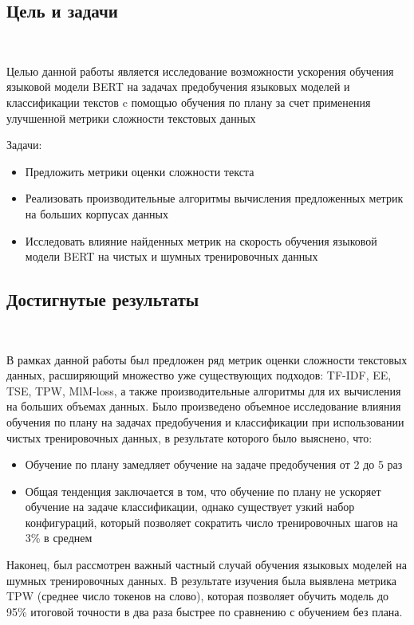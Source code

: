 \documentclass{spbau-diploma}
\begin{document}
\subsection*{Цель и задачи}
\ 

Целью данной работы является исследование возможности ускорения обучения языковой модели BERT на задачах предобучения языковых моделей и классификации текстов c помощью обучения по плану за счет применения улучшенной метрики сложности текстовых данных

\vspace*{20pt}
Задачи:
\begin{itemize}
	\item Предложить метрики оценки сложности текста
	\item Реализовать производительные алгоритмы вычисления предложенных метрик на больших корпусах данных
	\item Исследовать влияние найденных метрик на скорость обучения языковой модели BERT на чистых и шумных тренировочных данных
\end{itemize}
\pagebreak
\subsection*{Достигнутые результаты}
\ 

В рамках данной работы был предложен ряд метрик оценки сложности текстовых данных, расширяющий множество уже существующих подходов: TF-IDF, EE, TSE, TPW, MlM-loss, а также производительные алгоритмы для их вычисления на больших объемах данных. Было произведено объемное исследование влияния обучения по плану на задачах предобучения и классификации при использовании чистых тренировочных данных, в результате которого было выяснено, что:

\begin{itemize}
	\item Обучение по плану замедляет обучение на задаче предобучения от 2 до 5 раз
	\item Общая тенденция заключается в том, что обучение по плану не ускоряет обучение на задаче классификации, однако существует узкий набор конфигураций, который позволяет сократить число тренировочных шагов на 3\% в среднем
\end{itemize}

Наконец, был рассмотрен важный частный случай обучения языковых моделей на шумных тренировочных данных. В результате изучения была выявлена метрика TPW (среднее число токенов на слово), которая позволяет обучить модель до 95\% итоговой точности в два раза быстрее по сравнению с обучением без плана.
\end{document}
